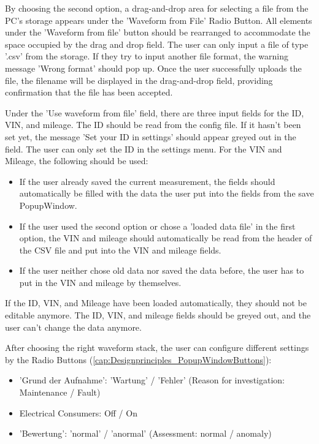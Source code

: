 \documentclass[]{scrreprt}
\begin{document}
By choosing the second option, a drag-and-drop area for selecting a file from the PC's storage appears under the 'Waveform from File' Radio Button. 
All elements under the 'Waveform from file' button should be rearranged to accommodate the space occupied by the drag and drop field. 
The user can only input a file of type '.csv' from the storage. If they try to input another file format, the warning message 'Wrong format' should pop up. 
Once the user successfully uploads the file, the filename will be displayed in the drag-and-drop field, providing confirmation that the file has been accepted.

Under the 'Use waveform from file' field, there are three input fields for the ID, VIN, and mileage. The ID should be read from the config file. 
If it hasn't been set yet, the message 'Set your ID in settings' should appear greyed out in the field. The user can only set the ID in the settings menu. For the VIN and Mileage, the following should be used:
\begin{itemize}
    \item If the user already saved the current measurement, the fields should automatically be filled with the data the user put into the fields from the save PopupWindow.
    \item If the user used the second option or chose a 'loaded data file' in the first option, the VIN and mileage should automatically be read from the header of the CSV file and put into the VIN and mileage fields.
    \item If the user neither chose old data nor saved the data before, the user has to put in the VIN and mileage by themselves.
\end{itemize}

If the ID, VIN, and Mileage have been loaded automatically, they should not be editable anymore. The ID, VIN, and mileage fields should be greyed out, and the user can't change the data anymore.

After choosing the right waveform stack, the user can configure different settings by the Radio Buttons (\ref{cap:Designprinciples_PopupWindowButtons}):
\begin{itemize}
    \item 'Grund der Aufnahme': 'Wartung' / 'Fehler' (Reason for investigation: Maintenance / Fault)
    \item Electrical Consumers: Off / On
    \item 'Bewertung': 'normal' / 'anormal' (Assessment: normal / anomaly)
\end{itemize}
\end{document}
